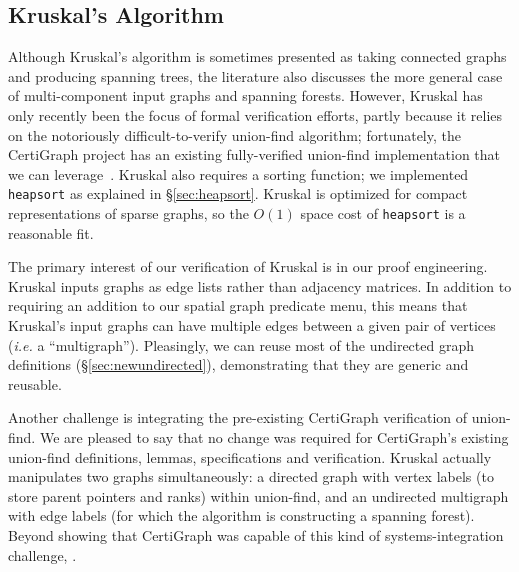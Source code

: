 \subsection{Kruskal's Algorithm}
\label{sec:kruskal}

Although Kruskal's algorithm is sometimes presented as taking connected graphs and producing spanning trees, the literature also discusses the more general case of multi-component input graphs and spanning forests.  However, Kruskal has only recently been the focus of formal verification efforts, partly because it relies on the notoriously difficult-to-verify union-find algorithm; fortunately, the CertiGraph project has an existing fully-verified union-find implementation that we can leverage~\cite{DBLP:journals/pacmpl/WangCMH19}.  Kruskal also requires a sorting function; we implemented \texttt{heapsort} as explained in \S\ref{sec:heapsort}.  Kruskal is optimized for compact representations of sparse graphs, so the $O(1)$ space cost of \texttt{heapsort} is a reasonable fit.  %

The primary interest of our verification of Kruskal is in our proof engineering.  Kruskal inputs graphs as edge lists rather than adjacency matrices.  In addition to requiring an addition to our spatial graph predicate menu, this means that Kruskal's input graphs can have multiple edges between a given pair of vertices (\emph{i.e.} a ``multigraph'').  Pleasingly, we can reuse most of the undirected graph definitions (\S\ref{sec:newundirected}), demonstrating that they are generic and reusable.

Another challenge is integrating the pre-existing CertiGraph verification of union-find.  We are pleased to say that no change was required for CertiGraph's existing union-find definitions, lemmas, specifications and verification.  Kruskal actually manipulates two graphs simultaneously: a directed graph with vertex labels (to store parent pointers and ranks) within union-find, and an undirected multigraph with edge labels (for which the algorithm is constructing a spanning forest).  Beyond showing that CertiGraph was capable of this kind of systems-integration challenge, .

